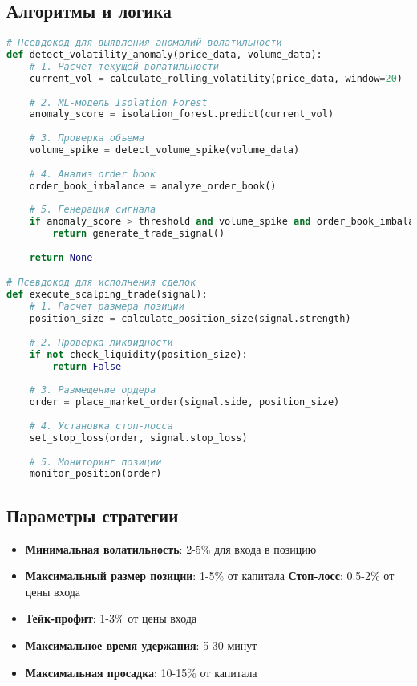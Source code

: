 \documentclass[12pt,a4paper]{article}
\begin{document}
\subsection{Алгоритмы и логика}
\begin{lstlisting}[language=Python, basicstyle=\small]
# Псевдокод для выявления аномалий волатильности
def detect_volatility_anomaly(price_data, volume_data):
    # 1. Расчет текущей волатильности
    current_vol = calculate_rolling_volatility(price_data, window=20)
    
    # 2. ML-модель Isolation Forest
    anomaly_score = isolation_forest.predict(current_vol)
    
    # 3. Проверка объема
    volume_spike = detect_volume_spike(volume_data)
    
    # 4. Анализ order book
    order_book_imbalance = analyze_order_book()
    
    # 5. Генерация сигнала
    if anomaly_score > threshold and volume_spike and order_book_imbalance:
        return generate_trade_signal()
    
    return None

# Псевдокод для исполнения сделок
def execute_scalping_trade(signal):
    # 1. Расчет размера позиции
    position_size = calculate_position_size(signal.strength)
    
    # 2. Проверка ликвидности
    if not check_liquidity(position_size):
        return False
    
    # 3. Размещение ордера
    order = place_market_order(signal.side, position_size)
    
    # 4. Установка стоп-лосса
    set_stop_loss(order, signal.stop_loss)
    
    # 5. Мониторинг позиции
    monitor_position(order)
\end{lstlisting}

\subsection{Параметры стратегии}
\begin{itemize}
    \item \textbf{Минимальная волатильность}: 2-5\% для входа в позицию
    \item \textbf{Максимальный размер позиции}: 1-5\% от капитала
    \textbf{Стоп-лосс}: 0.5-2\% от цены входа
    \item \textbf{Тейк-профит}: 1-3\% от цены входа
    \item \textbf{Максимальное время удержания}: 5-30 минут
    \item \textbf{Максимальная просадка}: 10-15\% от капитала
\end{itemize}
\end{document}
